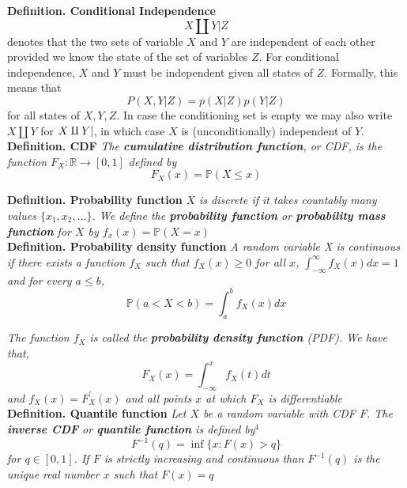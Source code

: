 \documentclass[11pt,a4paper]{report}
\begin{document}
\noindent \textbf{Definition. Conditional Independence}
$$X \amalg Y | Z$$
denotes that the two sets of variable $X$ and $Y$ are independent of
each other provided we know the state of the set of variables $Z$. For
conditional independence, $X$ and $Y$ must be independent given all
states of $Z$. Formally, this means that
$$P(X,Y|Z) = p(X|Z)p(Y|Z)$$
for all states of $X,Y,Z$. In case the conditioning set is empty we
may also write $X \amalg Y$ for $X \amalg Y | \empty$, in which case
$X$ is (unconditionally) independent of $Y$.\\



\noindent \textbf{Definition. CDF} \emph{The \textbf{cumulative
    distribution function}, or CDF, is the function $F_X : \mathbb{R}
  \to [0,1]$ defined by}
$$F_X(x) = \mathbb{P}(X \leq x)$$

\noindent \textbf{Definition. Probability function} \emph{$X$ is
  discrete if it takes countably many values $\{x_1,x_2,...\}$. We
  define the \textbf{probability function} or \textbf{probability mass
    function} for $X$ by $f_x(x) = \mathbb{P}(X = x)$}\\

\noindent \textbf{Definition. Probability density function} \emph{A
  random variable X is continuous if there exists a function $f_X$
  such that $f_X(x) \geq 0$ for all $x$,
  $\int_{-\infty}^{\infty}f_X(x)dx = 1$ and for every $a \leq b$,} 
$$\mathbb{P}(a < X < b) = \int_{a}^{b}f_X(x)dx$$

\noindent \emph{The function $f_X$ is called the \textbf{probability
    density function} (PDF). We have that,}
$$F_X(x) = \int_{-\infty}^{x}f_X(t)dt$$
\emph{and $f_X(x) = F_X^{'}(x)$ and all points $x$ at which $F_X$ is
  differentiable}\\

\noindent \textbf{Definition. Quantile function} \emph{Let $X$ be a
  random variable with CDF $F$. The \textbf{inverse CDF} or
  \textbf{quantile function} is defined by$^{4}$}
$$F^{-1}(q) = \inf\{x : F(x) > q\}$$
\emph{for $q \in [0,1]$. If $F$ is strictly increasing and continuous
  than $F^{-1}(q)$ is the unique real number $x$ such that $F(x) =
  q$}
\end{document}
